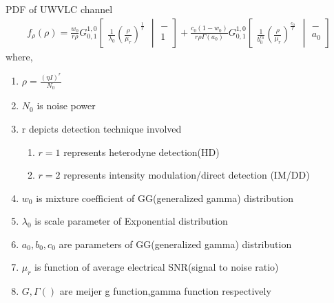 \documentclass{beamer}
\providecommand{\sbrak}[1]{\ensuremath{{}\left[#1\right]}}
\providecommand{\brak}[1]{\ensuremath{\left(#1\right)}}
\begin{document}
\begin{frame}
\begin{block}{PDF of UWVLC channel}
\begin{align}
f_{\rho}(\rho)=\frac{w_0}{r \rho}G^{1,0}_{0,1} \sbrak{\begin{array}{c}
\frac{1}{{\lambda}_0}\brak{\frac{\rho}{{\mu}_r}}^\frac{1}{r}  
\end{array} \middle \vert
\begin{array}{c}
- \\
1
\end{array} } + \frac{c_0(1-w_0)}{r \rho \Gamma(a_0)}G^{1,0}_{0,1} \sbrak{\begin{array}{c}
\frac{1}{b_0^{c_0}}\brak{\frac{\rho}{{\mu}_r}}^\frac{c_0}{r}  
\end{array} \middle \vert
\begin{array}{c}
- \\
a_0
\end{array} } \label{pdf}
\end{align}
where,
\begin{enumerate}
\item $\rho=\frac{(\eta I)^r}{N_0}$
\item $N_0$ is noise power
\item r depicts detection technique involved
\begin{enumerate}
\item  $r=1$ represents heterodyne detection(HD)
\item  $r=2$ represents intensity modulation/direct detection (IM/DD)
\end{enumerate}
\item $w_0$ is mixture coefficient of GG(generalized gamma) distribution
\item $\lambda_0$ is scale parameter of Exponential distribution
\item $a_0,b_0,c_0$ are parameters of GG(generalized gamma) distribution
\item $\mu_r$ is function of average electrical SNR(signal to noise ratio)
\item $G,\Gamma()$ are meijer g function,gamma function respectively
\end{enumerate}
\end{block}
\end{frame}
\end{document}
